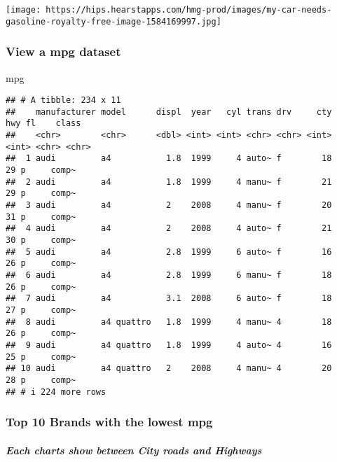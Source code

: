\documentclass[
]{article}
\newenvironment{Shaded}{\begin{snugshade}}{\end{snugshade}}
\newcommand{\NormalTok}[1]{#1}
\begin{document}
\texttt{[image: https://hips.hearstapps.com/hmg-prod/images/my-car-needs-gasoline-royalty-free-image-1584169997.jpg]}

\hypertarget{view-a-mpg-dataset}{%
\subsubsection{\texorpdfstring{\textbf{View a mpg
dataset}}{View a mpg dataset}}\label{view-a-mpg-dataset}}

\begin{Shaded}
\begin{Highlighting}[]
\NormalTok{mpg}
\end{Highlighting}
\end{Shaded}

\begin{verbatim}
## # A tibble: 234 x 11
##    manufacturer model      displ  year   cyl trans drv     cty   hwy fl    class
##    <chr>        <chr>      <dbl> <int> <int> <chr> <chr> <int> <int> <chr> <chr>
##  1 audi         a4           1.8  1999     4 auto~ f        18    29 p     comp~
##  2 audi         a4           1.8  1999     4 manu~ f        21    29 p     comp~
##  3 audi         a4           2    2008     4 manu~ f        20    31 p     comp~
##  4 audi         a4           2    2008     4 auto~ f        21    30 p     comp~
##  5 audi         a4           2.8  1999     6 auto~ f        16    26 p     comp~
##  6 audi         a4           2.8  1999     6 manu~ f        18    26 p     comp~
##  7 audi         a4           3.1  2008     6 auto~ f        18    27 p     comp~
##  8 audi         a4 quattro   1.8  1999     4 manu~ 4        18    26 p     comp~
##  9 audi         a4 quattro   1.8  1999     4 auto~ 4        16    25 p     comp~
## 10 audi         a4 quattro   2    2008     4 manu~ 4        20    28 p     comp~
## # i 224 more rows
\end{verbatim}

\hypertarget{top-10-brands-with-the-lowest-mpg}{%
\subsubsection{\texorpdfstring{\textbf{Top 10 Brands with the lowest
mpg}}{Top 10 Brands with the lowest mpg}}\label{top-10-brands-with-the-lowest-mpg}}

\hypertarget{each-charts-show-between-city-roads-and-highways}{%
\paragraph{\texorpdfstring{\emph{Each charts show between City roads and
Highways}}{Each charts show between City roads and Highways}}\label{each-charts-show-between-city-roads-and-highways}}
\end{document}

